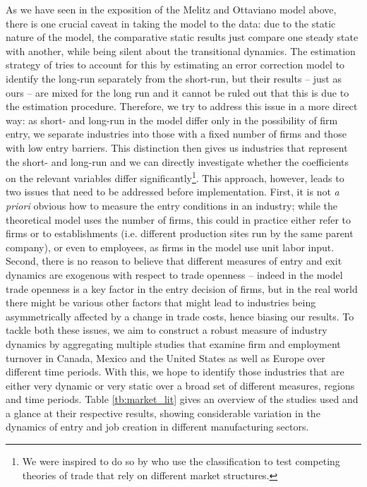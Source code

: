 \documentclass[a4paper,12pt]{article}
\begin{document}
As we have seen in the exposition of the Melitz and Ottaviano model above, there is one crucial caveat in taking the model to the data: due to the static nature of the model, the comparative static results just compare one steady state with another, while being silent about the transitional dynamics. The estimation strategy of \citet{Chen2009} tries to account for this by estimating an error correction model to identify the long-run separately from the short-run, but their results -- just as ours -- are mixed for the long run and it cannot be ruled out that this is due to the estimation procedure. Therefore, we try to address this issue in a more direct way: as short- and long-run in the model differ only in the possibility of firm entry, we separate industries into those with a fixed number of firms and those with low entry barriers. This distinction then gives us industries that represent the short- and long-run and we can directly investigate whether the coefficients on the relevant variables differ significantly\footnote{We were inspired to do so by \citet{Head1999} who use the classification to test competing theories of trade that rely on different market structures.}. This approach, however, leads to two issues that need to be addressed before implementation. First, it is not \textit{a priori} obvious how to measure the entry conditions in an industry; while the theoretical model uses the number of firms, this could in practice either refer to firms or to establishments (i.e. different production sites run by the same parent company), or even to employees, as firms in the model use unit labor input. Second, there is no reason to believe that different measures of entry and exit dynamics are exogenous with respect to trade openness -- indeed in the model trade openness is a key factor in the entry decision of firms, but in the real world there might be various other factors that might lead to industries being asymmetrically affected by a change in trade costs, hence biasing our results. To tackle both these issues, we aim to construct a robust measure of industry dynamics by aggregating multiple studies that examine firm and employment turnover in Canada, Mexico and the United States as well as Europe over different time periods. With this, we hope to identify those industries that are either very dynamic or very static over a broad set of different measures, regions and time periods. Table \ref{tb:market_lit} gives an overview of the studies used and a glance at their respective results, showing considerable variation in the dynamics of entry and job creation in different manufacturing sectors.
 
\end{document}
